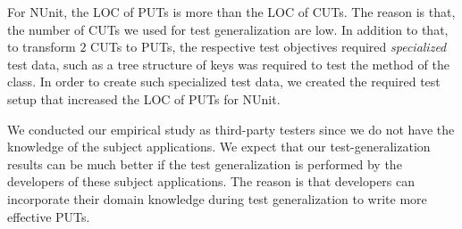 For NUnit, the LOC of PUTs is more than the LOC of CUTs. The reason is that, the number of CUTs we used for test generalization are low. In addition to that, to transform $2$ CUTs to PUTs, the respective test objectives required \textit{specialized} test data, such as a tree structure of keys was required to test the  method of the  class. In order to create such specialized test data, we created the required test setup that increased the LOC of PUTs for NUnit.

We conducted our empirical study as third-party testers since we do not have the knowledge of the subject applications. We expect that our test-generalization results can be much better if the test generalization is performed by the developers of these subject applications. The reason is that developers can incorporate their domain knowledge during test generalization to write more effective PUTs.



